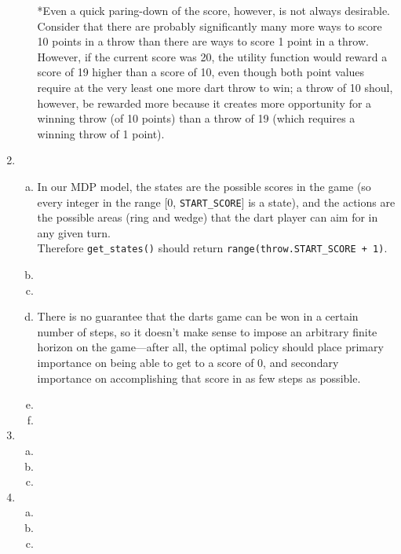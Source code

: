 \documentclass{article}
\begin{document}
\begin{enumerate}
\begin{enumerate}[(a)]
                *Even a quick paring-down of the score, however, is not always desirable. Consider that there are probably significantly many more ways to score 10 points in a throw than there are ways to score 1 point in a throw. However, if the current score was 20, the utility function would reward a score of 19 higher than a score of 10, even though both point values require at the very least one more dart throw to win; a throw of 10 shoul, however, be rewarded more because it creates more opportunity for a winning throw (of 10 points) than a throw of 19 (which requires a winning throw of 1 point).
            \end{enumerate}
        \item
            \begin{enumerate}[(a)]
                \item In our MDP model, the states are the possible scores in the game (so every integer in the range [0, \texttt{START\_SCORE}] is a state), and the actions are the possible areas (ring and wedge) that the dart player can aim for in any given turn. \\

                Therefore \texttt{get\_states()} should return \texttt{range(throw.START\_SCORE + 1)}.
                \item 
                \item %
                \item There is no guarantee that the darts game can be won in a certain number of steps, so it doesn't make sense to impose an arbitrary finite horizon on the game---after all, the optimal policy should place primary importance on being able to get to a score of 0, and secondary importance on accomplishing that score in as few steps as possible.
                \item %
                \item %
            \end{enumerate}        
        \item
            \begin{enumerate}[(a)]
                \item %
                \item %
                \item %
            \end{enumerate}        
        \item
            \begin{enumerate}[(a)]
                \item %
                \item %
                \item %
            \end{enumerate}                
    \end{enumerate}
\end{document}
